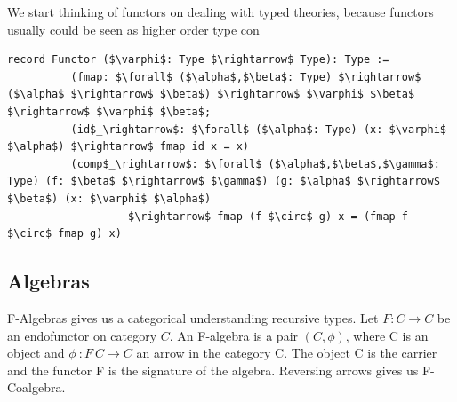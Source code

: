\documentclass[11pt,oneside]{article}
\begin{document}
\begin{prooftree}
\end{prooftree}

\begin{prooftree}
\end{prooftree}

\begin{prooftree}
\end{prooftree}

   We start thinking of functors on dealing with typed theories, because functors usually
   could be seen as higher order type con

\vspace{1cm}
\begin{lstlisting}[mathescape=true]
   record Functor ($\varphi$: Type $\rightarrow$ Type): Type :=
          (fmap: $\forall$ ($\alpha$,$\beta$: Type) $\rightarrow$ ($\alpha$ $\rightarrow$ $\beta$) $\rightarrow$ $\varphi$ $\beta$ $\rightarrow$ $\varphi$ $\beta$;
          (id$_\rightarrow$: $\forall$ ($\alpha$: Type) (x: $\varphi$ $\alpha$) $\rightarrow$ fmap id x = x)
          (comp$_\rightarrow$: $\forall$ ($\alpha$,$\beta$,$\gamma$: Type) (f: $\beta$ $\rightarrow$ $\gamma$) (g: $\alpha$ $\rightarrow$ $\beta$) (x: $\varphi$ $\alpha$)
                   $\rightarrow$ fmap (f $\circ$ g) x = (fmap f $\circ$ fmap g) x)
\end{lstlisting}





\newpage
   \subsection{Algebras}

   F-Algebras gives us a categorical understanding recursive types.
   Let $F : C \rightarrow C$ be an endofunctor on category $C$.
   An F-algebra is a pair $(C, \phi)$, where C is an object and $\phi\ : F\ C \rightarrow C$
   an arrow in the category C. The object C is the carrier and the functor
   F is the signature of the algebra. Reversing arrows gives us F-Coalgebra.

\vspace{1cm}
\end{document}
